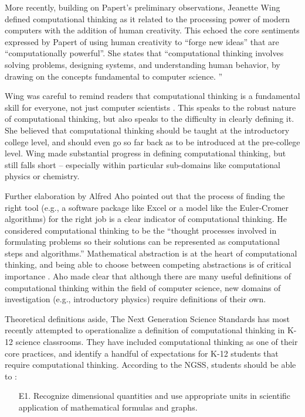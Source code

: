 \documentclass{msuphddissertation}
\begin{document}
\begin{doublespace}
More recently, building on Papert's preliminary observations, Jeanette Wing defined computational thinking as it related to the processing power of modern computers with the addition of human creativity.  This echoed the core sentiments expressed by Papert of using human creativity to ``forge new ideas'' that are ``computationally powerful''.  She states that ``computational thinking involves solving problems, designing systems, and understanding human behavior, by drawing on the concepts fundamental to computer science. \cite{Wing2006}''

Wing was careful to remind readers that computational thinking is a fundamental skill for everyone, not just computer scientists \cite{Wing2008}.  This speaks to the robust nature of computational thinking, but also speaks to the difficulty in clearly defining it.  She believed that computational thinking should be taught at the introductory college level, and should even go so far back as to be introduced at the pre-college level.  Wing made substantial progress in defining computational thinking, but still falls short -- especially within particular sub-domains like computational physics or chemistry.

Further elaboration by Alfred Aho pointed out that the process of finding the right tool (e.g., a software package like Excel or a model like the Euler-Cromer algorithms) for the right job is a clear indicator of computational thinking.  He considered computational thinking to be the ``thought processes involved in formulating problems so their solutions can be represented as computational steps and algorithms.''  Mathematical abstraction is at the heart of computational thinking, and being able to choose between competing abstractions is of critical importance \cite{Aho2012}.  Aho made clear that although there are many useful definitions of computational thinking within the field of computer science, new domains of investigation (e.g., introductory physics) require definitions of their own.

Theoretical definitions aside, The Next Generation Science Standards has most recently attempted to operationalize a definition of computational thinking in K-12 science classrooms.  They have included computational thinking as one of their core practices, and identify a handful of expectations for K-12 students that require computational thinking.  According to the NGSS, students should be able to \cite{NGSS2012}: \begin{enumerate}
\item[E1.] Recognize dimensional quantities and use appropriate units in scientific application of mathematical formulas and graphs.


\end{enumerate}
\end{doublespace}
\end{document}
